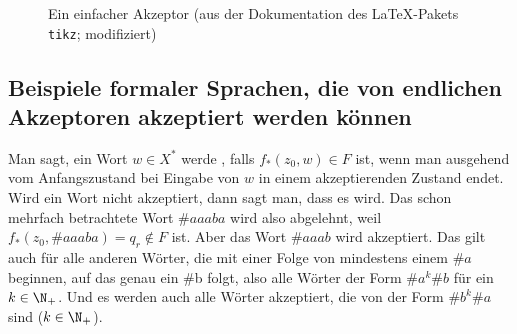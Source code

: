\begin{figure}[ht]
  \centering
  \caption{Ein einfacher Akzeptor (aus der Dokumentation des
    \LaTeX-Pakets \texttt{tikz}; modifiziert)}
  \label{fig:bsp-akzeptor}
\end{figure}

\Tut\subsection{Beispiele formaler Sprachen, die von endlichen Akzeptoren akzeptiert werden k\"onnen}
\label{subsec:akzeptierbar}

Man sagt, ein Wort $w\in X^*$ werde , falls
$f_*(z_0,w)\in F$ ist, \dh wenn man ausgehend vom Anfangszustand bei
Eingabe von $w$ in einem akzeptierenden Zustand endet. Wird ein Wort
nicht akzeptiert, dann sagt man, dass es 
wird. Das schon mehrfach betrachtete Wort $\#{aaaba}$ wird also
abgelehnt, weil $f_*(z_0,\#{aaaba})=q_r\notin F$ ist. Aber \zB das
Wort $\#{aaab}$ wird akzeptiert. Das gilt auch für alle anderen
Wörter, die mit einer Folge von mindestens einem $\#a$ beginnen, auf
das genau ein \#b folgt, also alle Wörter der Form $\#a^k\#b$ für ein
$k\in \N_+$. Und es werden auch alle Wörter akzeptiert, die von der
Form $\#b^k\#a$ sind ($k\in \N_+$).


